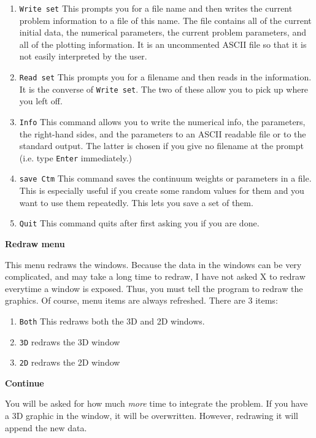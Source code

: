 \begin{enumerate}
\item {\tt Write set}  This prompts you for a file name and then
writes the current problem information to a file of this name. The
file contains all of the current initial data, the numerical
parameters, the current problem parameters, and all of the plotting
information. It is an uncommented ASCII file so that it is not easily
interpreted by the user. 
\item {\tt Read set} This prompts you for a filename and then reads in
the information.  It is the converse of {\tt Write set}.  The two of
these allow you to pick up where you left off.
\item {\tt Info} This command allows you to write the numerical info,
the parameters, the right-hand sides, and the parameters to an ASCII
readable file or to the standard output.  The latter is chosen if you
give no filename at the prompt (i.e. type {\tt Enter} immediately.) 
\item {\tt save Ctm} This command saves the continuum weights or
parameters in a file.  This is especially useful if you create some
random values for them and you want to use them repeatedly. This lets
you save a set of them.
\item {\tt Quit} This command quits \xtc after first asking you if you
are done.
\end{enumerate}
 
\vspace{.25 in}
\begin{center}
{\bf \large Redraw menu}
\end{center}
This menu redraws the windows.  Because the data in the windows can be
very complicated, and may take a long time to redraw, I have not asked
X to redraw everytime a window is exposed.  Thus, you must tell the
program to redraw the graphics.  Of course, menu items are always
refreshed.
There are 3 items:
\begin{enumerate}
\item {\tt Both} This redraws both the 3D and 2D windows.
\item {\tt 3D} redraws the 3D window
\item {\tt 2D} redraws the 2D window
\end{enumerate}

\vspace{.25 in}
\begin{center}
{\bf \large Continue}
\end{center}
You will be asked for how much {\it more} time to integrate the
problem.  If you have a 3D graphic in the window, it will be
overwritten.  However, redrawing it will append the new data.


